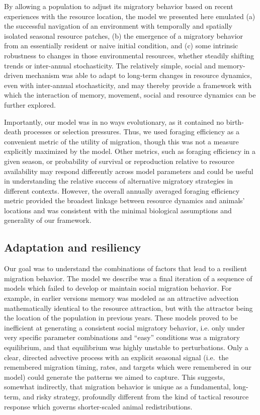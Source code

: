 \documentclass[utf8]{frontiersSCNS} %
\begin{document}
	By allowing a population to adjust its migratory behavior based on recent experiences with the resource location, the model we presented here emulated (a) the successful navigation of an environment with temporally and spatially isolated seasonal resource patches, (b) the emergence of a migratory behavior from an essentially resident or naive initial condition, and (c) some intrinsic robustness to changes in those environmental resources, whether steadily shifting trends or inter-annual stochasticity. The relatively simple, social and memory-driven mechanism was able to adapt to long-term changes in resource dynamics, even with inter-annual stochasticity, and may thereby provide a framework with which the interaction of memory, movement, social and resource dynamics can be further explored.  %

	Importantly, our model was in no ways evolutionary, as it contained no birth-death processes or selection pressures. Thus, we used foraging efficiency as a convenient metric of the utility of migration, though this was not a measure explicitly maximized by the model. Other metrics, such as foraging efficiency in a given season, or probability of survival or reproduction relative to resource availability \citep{Bauer2020} may respond differently across model parameters and could be useful in understanding the relative success of alternative migratory strategies in different contexts. However, the overall annually averaged foraging efficiency metric provided the broadest linkage between resource dynamics and animals' locations and was consistent with the minimal biological assumptions and generality of our framework. \\


\subsection{Adaptation and resiliency}
	
	Our goal was to understand the combinations of factors that lead to a resilient migration behavior. The model we describe was a final iteration of a sequence of models which failed to develop or maintain social migration behavior. For example, in earlier versions memory was modeled as an attractive advection mathematically identical to the resource attraction, but with the attractor being the location of the population in previous years.  These models proved to be inefficient at generating a consistent social migratory behavior, i.e. only under very specific parameter combinations and ``easy'' conditions was a migratory equilibrium, and that equilibrium was highly unstable to perturbations.  Only a clear, directed advective process with an explicit seasonal signal (i.e.~the remembered migration timing, rates, and targets which were remembered in our model) could generate the patterns we aimed to capture.  This suggests, somewhat indirectly, that migration behavior is unique as a fundamental, long-term, and risky strategy, profoundly different from the kind of tactical resource response which governs shorter-scaled animal redistributions. 
	
\end{document}
